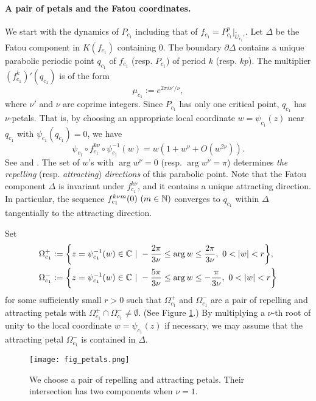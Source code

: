 \paragraph{\bf A pair of petals and the Fatou coordinates.}
We start with the dynamics of $P_{c_1}$
including that of $f_{c_1}= P_{c_1}^p|_{\widetilde{U}_{c_1}'}$.
Let $\Delta$ be the Fatou component in $K(f_{c_1})$
containing $0$. 
The boundary $\partial \Delta$ contains
a unique parabolic periodic point $q_{c_1}$ of $f_{c_1}$ 
(resp. $P_{c_1}$)
of period $k$ 
(resp. $kp$).
The multiplier $(f_{c_1}^k)'(q_{c_1})$ is of the form
$$
\mu_{c_1}:=e^{2 \pi i \nu'/\nu},
$$
where $\nu'$ and $\nu$ are coprime integers.
Since $P_{c_1}$ has only one critical point,
$q_{c_1}$ has $\nu$-petals.
That is, by choosing an appropriate local coordinate $w=\psi_{c_1}(z)$ 
near $q_{c_1}$ with $\psi_{c_1}(q_{c_1})=0$,
we have 
$$
\psi_{c_1} \circ f_{c_1}^{k\nu} \circ \psi_{c_1}^{-1}(w)=w(1 + w^{\nu}+O(w^{2\nu})).
$$
See \cite[Proof of Theorem 6.5.7]{Beardon 1991} 
and \cite[Appendix A.2]{Kawahira 2009}.
The set of $w$'s with $\arg w^\nu=0$ (resp. $\arg w^\nu =\pi$) 
determines {\it the repelling} 
(resp. {\it attracting})  {\it directions} of this parabolic point. 
Note that the Fatou component $\Delta$ is invariant under 
$f_{c_1}^{k\nu}$,
and it contains a unique attracting direction.
In particular, the sequence $f_{c_1}^{k\nu m}(0)~(m \in \mathbb N)$ 
converges to $q_{c_1}$ within $\Delta$ 
tangentially to the attracting direction.

Set 
\begin{align*}
\Omega_{c_1}^+&:=
{\left\{ 
z=\psi_{c_1}^{-1}(w) 
\in \mathbb C \ | \  -\frac{2\pi}{3\nu} \le \arg w \le \frac{2\pi}{3\nu},~0 < |w|<r
 \right\}},\\
\Omega_{c_1}^-&:=
{\left\{ 
z=\psi_{c_1}^{-1}(w) \in \mathbb C \ | \  
-\frac{5\pi}{3\nu} \le \arg w \le -\frac{\pi}{3\nu}
,~0 < |w|<r \right\}}
\end{align*}
for some sufficiently small $r>0$ such that 
$\Omega_{c_1}^+$ and $\Omega_{c_1}^-$ are a pair of repelling and attracting petals 
with $\Omega_{c_1}^+ \cap \Omega_{c_1}^- \neq \emptyset$.
(See Figure \ref{fig_petals}.)
By multiplying a $\nu$-th root of unity to the local coordinate $w=\psi_{c_1}(z)$ if necessary, 
we may assume that the attracting petal $\Omega_{c_1}^-$ is contained in $\Delta$.

\begin{figure}[htbp]
\begin{center}
\texttt{[image: fig\_petals.png]}
\end{center}
\caption{\small We choose a pair of repelling and attracting petals.
Their intersection has two components when $\nu=1$.}
\label{fig_petals}
\end{figure}



